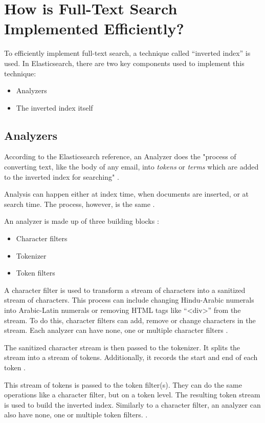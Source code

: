 \chapter{How is Full-Text Search Implemented Efficiently?}

To efficiently implement full-text search, a technique called “inverted index” is used. In Elasticsearch, there are two key components used to implement this technique:
\begin{itemize}
    \item Analyzers
    \item The inverted index itself
\end{itemize}

\section{Analyzers}
According to the Elasticsearch reference, an Analyzer does the "process of converting text, like the body of any email, into \textit{tokens} or \textit{terms} which are added to the inverted index for searching" \autocite{elasticsearch_anal} .

Analysis can happen either at index time, when documents are inserted, or at search time. The process, however, is the same \autocite{elasticsearch_anal}.

An analyzer is made up of three building blocks \autocite{elasticsearch_anal2}:
\begin{itemize}
    \item Character filters
    \item Tokenizer
    \item Token filters
\end{itemize}

A character filter is used to transform a stream of characters into a sanitized stream of characters. This process can include changing Hindu-Arabic numerals into Arabic-Latin numerals or removing HTML tags like “<div>” from the stream. To do this, character filters can add, remove or change characters in the stream. Each analyzer can have none, one or multiple character filters \autocite{elasticsearch_anal2}.

The sanitized character stream is then passed to the tokenizer. It splits the stream into a stream of tokens. Additionally, it records the start and end of each token \autocite{elasticsearch_anal2}.

This stream of tokens is passed to the token filter(s). They can do the same operations like a character filter, but on a token level. The resulting token stream is used to build the inverted index. Similarly to a character filter, an analyzer can also have none, one or multiple token filters. \autocite{elasticsearch_anal2}.

